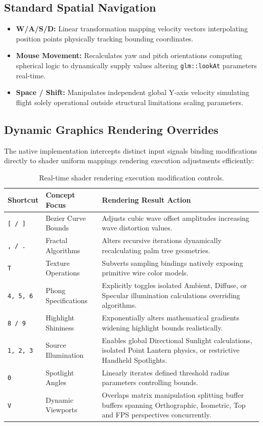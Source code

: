 \documentclass[12pt, a4paper]{article}
\begin{document}
\subsection{Standard Spatial Navigation}
\begin{itemize}
    \item \textbf{W/A/S/D:} Linear transformation mapping velocity vectors interpolating position points physically tracking bounding coordinates.
    \item \textbf{Mouse Movement:} Recalculates yaw and pitch orientations computing spherical logic to dynamically supply values altering \texttt{glm::lookAt} parameters real-time.
    \item \textbf{Space / Shift:} Manipulates independent global Y-axis velocity simulating flight solely operational outside structural limitations scaling parameters.
\end{itemize}

\subsection{Dynamic Graphics Rendering Overrides}
The native implementation intercepts distinct input signals binding modifications directly to shader uniform mappings rendering execution adjustments efficiently:

\begin{table}[H]
\centering
\begin{tabular}{@{}llp{8cm}@{}}
\toprule
\textbf{Shortcut} & \textbf{Concept Focus} & \textbf{Rendering Result Action} \\ \midrule
\texttt{[ / ]} & Bezier Curve Bounds & Adjusts cubic wave offset amplitudes increasing wave distortion values.\\
\texttt{, / .} & Fractal Algorithms & Alters recursive iterations dynamically recalculating palm tree geometries.\\
\texttt{T} & Texture Operations & Subverts sampling bindings natively exposing primitive wire color models.\\
\texttt{4, 5, 6} & Phong Specifications & Explicitly toggles isolated Ambient, Diffuse, or Specular illumination calculations overriding algorithms.\\
\texttt{8 / 9} & Highlight Shininess & Exponentially alters mathematical gradients widening highlight bounds realistically.\\
\texttt{1, 2, 3} & Source Illumination & Enables global Directional Sunlight calculations, isolated Point Lantern physics, or restrictive Handheld Spotlights.\\
\texttt{0} & Spotlight Angles & Linearly iterates defined threshold radius parameters controlling bounds.\\
\texttt{V} & Dynamic Viewports & Overlaps matrix manipulation splitting buffer buffers spanning Orthographic, Isometric, Top and FPS perspectives concurrently.\\ \bottomrule
\end{tabular}
\caption{Real-time shader rendering execution modification controls.}
\end{table}
\end{document}

